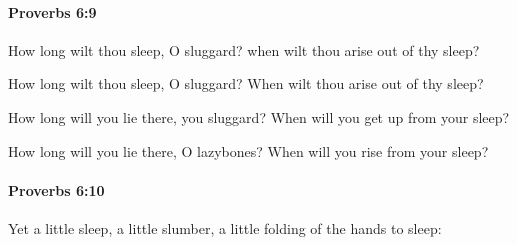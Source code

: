 		\paragraph{Proverbs 6:9} %
			\label{PROVERBS-6-9}

			How long wilt thou sleep, O sluggard? when wilt thou arise out of thy sleep?

			\begin{versebox}
					\item[BHS] 
					\item[ASV] How long wilt thou sleep, O sluggard? When wilt thou arise out of thy sleep?
					\item[NIV] How long will you lie there, you sluggard? When will you get up from your sleep?
					\item[NRSV] How long will you lie there, O lazybones? When will you rise from your sleep?
			\end{versebox}

		\paragraph{Proverbs 6:10} %
			\label{PROVERBS-6-10}

			Yet a little sleep, a little slumber, a little folding of the hands to sleep:

